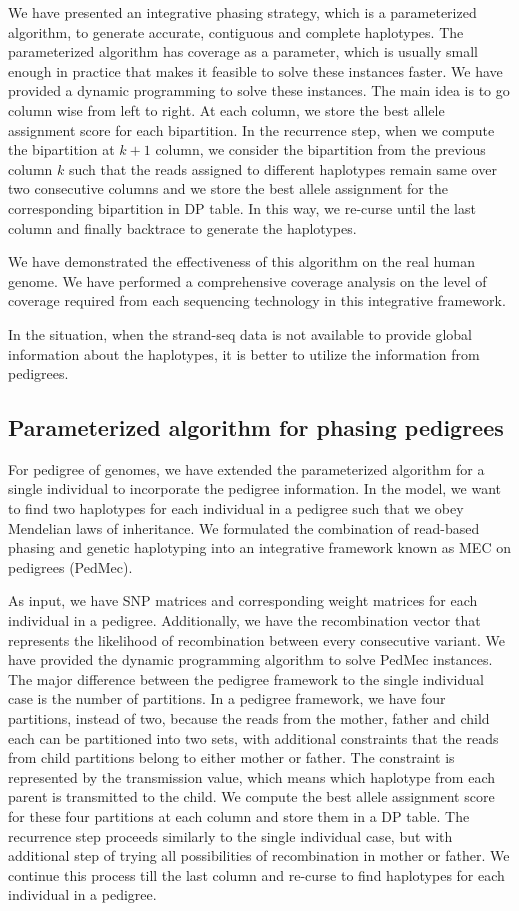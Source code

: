 We have presented an integrative phasing strategy, which is a parameterized algorithm, to generate accurate, contiguous and complete haplotypes. 
The parameterized algorithm has coverage as a parameter, which is usually small enough in practice that makes it feasible to solve these instances faster.
We have provided a dynamic programming to solve these instances. The main idea is to go column wise from left to right. At each column, we store the best allele assignment score for each bipartition.
In the recurrence step, when we compute the bipartition at $k+1$ column, we consider the bipartition from the previous column $k$ 
such that the reads assigned to different haplotypes remain same over two consecutive columns and we store the best allele assignment for the corresponding bipartition in DP table.
In this way, we re-curse until the last column and finally backtrace to generate the haplotypes.

We have demonstrated the effectiveness of this algorithm on the real human genome. 
We have performed a comprehensive coverage analysis on the level of coverage required from each sequencing technology in this integrative framework.

In the situation, when the strand-seq data is not available to provide global information about the haplotypes, it is better to utilize the information from pedigrees.
\subsection{Parameterized algorithm for phasing pedigrees}
For pedigree of genomes, we have extended the parameterized algorithm for a single individual to incorporate the pedigree information.
In the model, we want to find two haplotypes for each individual in a pedigree such that we obey Mendelian laws of inheritance.
We formulated the combination of read-based phasing and genetic haplotyping into an integrative framework known as MEC on pedigrees (PedMec).

As input, we have SNP matrices and corresponding weight matrices for each individual in a pedigree. 
Additionally, we have the recombination vector that represents the likelihood of recombination between every consecutive variant.
We have provided the dynamic programming algorithm to solve PedMec instances.
The major difference between the pedigree framework to the single individual case is the number of partitions.
In a pedigree framework, we have four partitions, instead of two, because the reads from the mother, father and child each can be partitioned into two sets, 
with additional constraints that the reads from child partitions belong to either mother or father.
The constraint is represented by the transmission value, which means which haplotype from each parent is transmitted to the child.
We compute the best allele assignment score for these four partitions at each column and store them in a DP table.
The recurrence step proceeds similarly to the single individual case, but with additional step of trying all possibilities of recombination in mother or father.
We continue this process till the last column and re-curse to find haplotypes for each individual in a pedigree.

